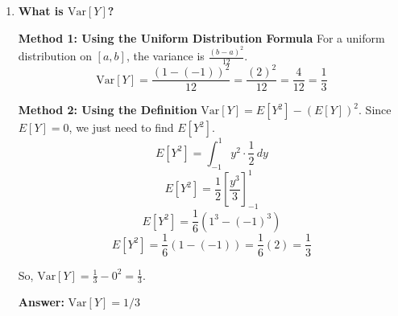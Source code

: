 \documentclass[12pt]{article}
\begin{document}
\begin{enumerate}[label=\textbf{\arabic*.}, leftmargin=*]
\begin{enumerate}[label=(\alph*)]
    Since $Y$ is uniformly distributed on $[a, b]$ where $a = -1$ and $b = 1$, the expected value is simply the midpoint of the interval.

    \textbf{Method 1: Using the Uniform Distribution Formula}
    \[ E[Y] = \frac{a + b}{2} = \frac{-1 + 1}{2} = \frac{0}{2} = 0 \]

    \textbf{Method 2: Using Integration}
    \[ E[Y] = \int_{-\infty}^{\infty} y \cdot f_Y(y) \, dy \]
    \[ E[Y] = \int_{-1}^{1} y \cdot \frac{1}{2} \, dy \]
    \[ E[Y] = \frac{1}{2} \left[ \frac{y^2}{2} \right]_{-1}^{1} \]
    \[ E[Y] = \frac{1}{4} (1^2 - (-1)^2) = \frac{1}{4}(1 - 1) = 0 \]

    \textbf{Answer:} $E[Y] = 0$

    \item \textbf{What is $\text{Var}[Y]$?}

    \textbf{Method 1: Using the Uniform Distribution Formula}
    For a uniform distribution on $[a, b]$, the variance is $\frac{(b - a)^2}{12}$.
    \[ \text{Var}[Y] = \frac{(1 - (-1))^2}{12} = \frac{(2)^2}{12} = \frac{4}{12} = \frac{1}{3} \]

    \textbf{Method 2: Using the Definition}
    $\text{Var}[Y] = E[Y^2] - (E[Y])^2$.
    Since $E[Y] = 0$, we just need to find $E[Y^2]$.
    \[ E[Y^2] = \int_{-1}^{1} y^2 \cdot \frac{1}{2} \, dy \]
    \[ E[Y^2] = \frac{1}{2} \left[ \frac{y^3}{3} \right]_{-1}^{1} \]
    \[ E[Y^2] = \frac{1}{6} (1^3 - (-1)^3) \]
    \[ E[Y^2] = \frac{1}{6} (1 - (-1)) = \frac{1}{6}(2) = \frac{1}{3} \]

    So, $\text{Var}[Y] = \frac{1}{3} - 0^2 = \frac{1}{3}$.

    \textbf{Answer:} $\text{Var}[Y] = 1/3$
\end{enumerate}

\end{enumerate}
\end{document}
